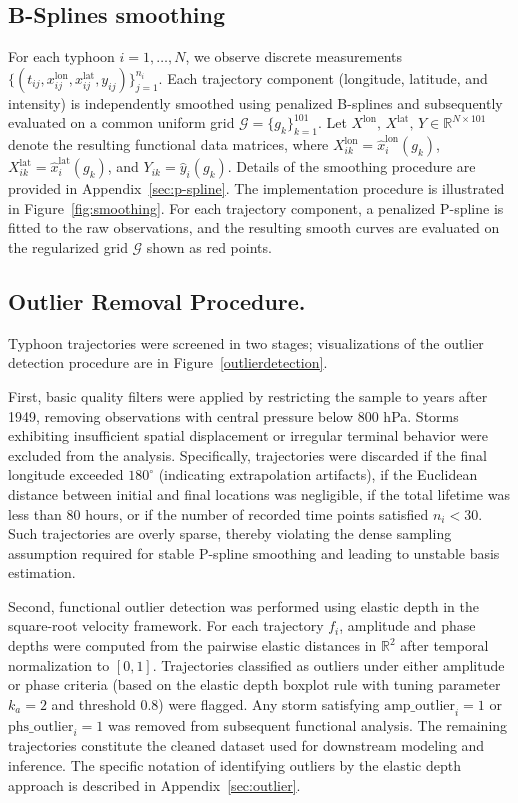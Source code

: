 \documentclass{article}
\begin{document}
\subsection{B-Splines smoothing}
For each typhoon $i=1,\dots,N$, we observe discrete measurements 
$\{(t_{ij}, x^{\mathrm{lon}}_{ij}, x^{\mathrm{lat}}_{ij}, y_{ij})\}_{j=1}^{n_i}$. Each trajectory component (longitude, latitude, and intensity) is independently smoothed using penalized B-splines \cite{eilers1996flexible} and subsequently evaluated on a common uniform grid $\mathcal G=\{g_k\}_{k=1}^{101}$.  Let $X^{\mathrm{lon}},\, X^{\mathrm{lat}},\, Y \in \mathbb{R}^{N\times 101}$ denote the resulting functional data matrices, where $X^{\mathrm{lon}}_{ik}=\hat x^{\mathrm{lon}}_i(g_k)$, $X^{\mathrm{lat}}_{ik}=\hat x^{\mathrm{lat}}_i(g_k)$, and $Y_{ik}=\hat y_i(g_k)$. Details of the smoothing procedure are provided in Appendix~\ref{sec:p-spline}. The implementation procedure is illustrated in Figure~\ref{fig:smoothing}. 
For each trajectory component, a penalized P-spline is fitted to the raw observations, and the resulting smooth curves are evaluated on the regularized grid $\mathcal G$ shown as red points.

\subsection{Outlier Removal Procedure.}
Typhoon trajectories were screened in two stages; visualizations of the outlier detection procedure are in Figure~\ref{outlierdetection}.

First, basic quality filters were applied by restricting the sample to years after 1949, removing observations with central pressure below 800 hPa. Storms exhibiting insufficient spatial displacement or irregular terminal behavior were excluded from the analysis. Specifically, trajectories were discarded if the final longitude exceeded $180^\circ$ (indicating extrapolation artifacts), if the Euclidean distance between initial and final locations was negligible, if the total lifetime was less than 80 hours, or if the number of recorded time points satisfied $n_i < 30$. Such trajectories are overly sparse, thereby violating the dense sampling assumption required for stable P-spline smoothing and leading to unstable basis estimation.

Second, functional outlier detection was performed using elastic depth \cite{harris2018elastic} in the square-root velocity framework. For each trajectory $f_i$, amplitude and phase depths were computed from the pairwise elastic distances in $\mathbb{R}^2$ after temporal normalization to $[0,1]$. Trajectories classified as outliers under either amplitude or phase criteria (based on the elastic depth boxplot rule with tuning parameter $k_a=2$ and threshold $0.8$) were flagged. Any storm satisfying $\text{amp\_outlier}_i = 1$ or $\text{phs\_outlier}_i = 1$ was removed from subsequent functional analysis. The remaining trajectories constitute the cleaned dataset used for downstream modeling and inference. The specific notation of identifying outliers by the elastic depth approach is described in Appendix~\ref{sec:outlier}.
\end{document}
